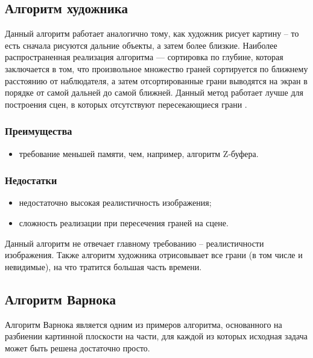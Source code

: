\subsection{Алгоритм художника}
Данный алгоритм работает аналогично тому, как художник рисует картину – то есть сначала рисуются дальние объекты, а затем более близкие. Наиболее распространенная реализация алгоритма --- сортировка по глубине, которая заключается в том, что произвольное множество граней сортируется по ближнему расстоянию от наблюдателя, а затем отсортированные грани выводятся на экран в порядке от самой дальней до самой ближней. Данный метод работает лучше для построения сцен, в которых отсутствуют пересекающиеся грани \cite{hudognik}. 

\subsubsection*{Преимущества}
\begin{itemize}
	\item	требование меньшей памяти, чем, например, алгоритм Z-буфера.
\end{itemize}

\subsubsection*{Недостатки}
\begin{itemize}
	\item	недостаточно высокая реалистичность изображения;
	\item	сложность реализации при пересечения граней на сцене.
\end{itemize}

Данный алгоритм не отвечает главному требованию – реалистичности изображения. Также алгоритм художника отрисовывает все грани (в том числе и невидимые), на что тратится большая часть времени.


\subsection{Алгоритм Варнока}

Алгоритм Варнока \cite{varnok} является одним из примеров алгоритма, основанного на разбиении картинной плоскости на части, для каждой из которых исходная задача может быть решена достаточно просто.


